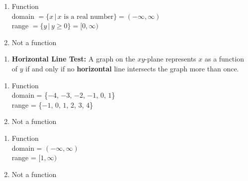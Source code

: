 \documentclass{ximera}
\begin{document}
\begin{multicols}{2}
\begin{enumerate}
\setcounter{enumi}{\value{HW}}


\item Function \\ domain $= \{x \, | \,  \text{$x$ is a real number} \} = (-\infty, \infty)$ \\  range $= \{y \, | \,  y \geq 0 \} = [0,\infty)$

\vfill

\columnbreak

\item  Not a function

\setcounter{HW}{\value{enumi}}
\end{enumerate}
\end{multicols}

\begin{enumerate}
\setcounter{enumi}{\value{HW}}

 \item \textbf{Horizontal Line Test:} A graph on the $xy$-plane represents $x$ as a function of $y$ if and only if no \textbf{horizontal} line intersects the graph more than once.
 
 \setcounter{HW}{\value{enumi}}
\end{enumerate}






\begin{multicols}{2}
\begin{enumerate}
\setcounter{enumi}{\value{HW}}

\item Function \\ domain = \{$-4$, $-3$, $-2$, $-1$, $0$, $1$\} \\ range = \{$-1$, $0$, $1$, $2$, $3$, $4$\}

\vfill

\columnbreak

\item Not a function

\setcounter{HW}{\value{enumi}}
\end{enumerate}
\end{multicols}


\begin{multicols}{2}
\begin{enumerate}
\setcounter{enumi}{\value{HW}}

\item Function \\ domain = $(-\infty, \infty)$ \\ range = $[1, \infty)$
\vfill

\columnbreak

\item Not a function 

\setcounter{HW}{\value{enumi}}
\end{enumerate}
\end{multicols}
\end{document}
